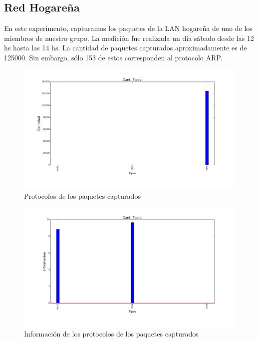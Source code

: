 \subsection{Red Hogareña}

En este experimento, capturamos los paquetes de la LAN hogareña de uno de los miembros de nuestro grupo. La medición fue realizada un día sábado desde las 12 hs hasta las 14 hs. La cantidad de paquetes capturados aproximadamente es de 125000. Sin embargo, sólo 153 de estos corresponden al protocolo ARP.

\begin{figure}[H]
       \centering
       \includegraphics[width=1\textwidth]{../resultados/Casa/histogram_types.png}
       \caption{Protocolos de los paquetes capturados}
       \label{red-hogarena-types}
\end{figure}

\begin{figure}[H]
       \centering
       \includegraphics[width=1\textwidth]{../resultados/Casa/histogram_types_information.png}
       \caption{Información de los protocolos de los paquetes capturados}
       \label{red-hogarena-types-info}
\end{figure}

